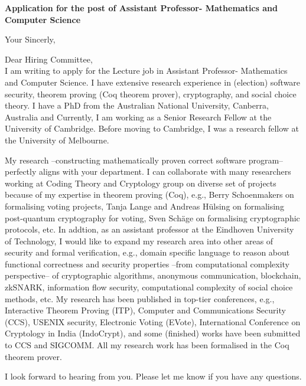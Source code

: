 \documentclass[11pt,a4paper,roman]{moderncv}
\begin{document}
\date{}
\opening{\textbf{Application for the post of Assistant Professor- Mathematics and Computer Science}}

\closing{Your Sincerly, \vspace{-1em}}



\makelettertitle



Dear Hiring Committee, 
\\
\vspace{1em}
I am writing to apply
for the Lecture job in Assistant Professor- Mathematics and Computer Science.
I have extensive research experience in
(election) software security, theorem proving (Coq theorem prover), cryptography,  
and social choice theory. 
I have a PhD from the Australian National University, Canberra, Australia
and Currently, I am working as a Senior Research Fellow at the University of 
Cambridge. Before moving to Cambridge, I was a 
research fellow at the University of Melbourne. 


My research --constructing mathematically proven correct software program-- 
perfectly aligns with your department. I can collaborate with many researchers 
working at Coding Theory and Cryptology group on diverse set of projects because of 
my expertise in theorem proving (Coq), e.g., 
Berry Schoenmakers on formalising voting projects, Tanja Lange  and Andreas H\"{u}lsing 
on formalising post-quantum cryptography for voting,  Sven Sch\"{a}ge on 
formalising cryptographic protocols, etc. In addtion, as an assistant professor at the 
Eindhoven University of Technology, 
I would like to expand my research area into other areas of 
security and formal verification, e.g., domain specific language to reason about 
functional correctness and security properties --from computational complexity perspective-- of 
cryptographic algorithms, anonymous communication, blockchain, zkSNARK,  
information flow security, computational complexity of social choice methods, 
etc. My research has been published in top-tier conferences, e.g., Interactive Theorem Proving (ITP), 
Computer and Communications Security (CCS), USENIX security, Electronic Voting (EVote), 
International Conference on Cryptology in India (IndoCrypt),
and some (finished) works have been submitted to CCS and SIGCOMM. 
All my research work has been formalised in the Coq theorem prover. 


\vspace{0.5cm}



I look forward to hearing from you. Please let me know if you have any questions. \\
 

\vspace{0.5cm}


\makeletterclosing
\end{document}
